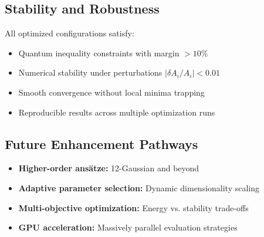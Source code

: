 \documentclass[11pt]{article}
\begin{document}
\subsection*{Stability and Robustness}
All optimized configurations satisfy:
\begin{itemize}
\item Quantum inequality constraints with margin $>10\%$
\item Numerical stability under perturbations $|\delta A_i/A_i| < 0.01$
\item Smooth convergence without local minima trapping
\item Reproducible results across multiple optimization runs
\end{itemize}

\subsection*{Future Enhancement Pathways}
\begin{itemize}
\item \textbf{Higher-order ansätze:} 12-Gaussian and beyond
\item \textbf{Adaptive parameter selection:} Dynamic dimensionality scaling
\item \textbf{Multi-objective optimization:} Energy vs. stability trade-offs
\item \textbf{GPU acceleration:} Massively parallel evaluation strategies
\end{itemize}
\end{document}
